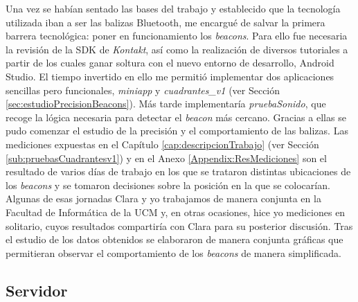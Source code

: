 Una vez se habían sentado las bases del trabajo y establecido que la tecnología utilizada iban a ser las balizas Bluetooth, me encargué de salvar la primera barrera tecnológica: poner en funcionamiento los \textit{beacons}. Para ello fue necesaria la revisión de la SDK de \textit{Kontakt}, así como la realización de diversos tutoriales a partir de los cuales ganar soltura con el nuevo entorno de desarrollo, Android Studio. El tiempo invertido en ello me permitió implementar dos aplicaciones sencillas pero funcionales, \textit{miniapp} y \textit{cuadrantes\_v1} (ver Sección \ref{sec:estudioPrecisionBeacons}). Más tarde implementaría \textit{pruebaSonido}, que recoge la lógica necesaria para detectar el \textit{beacon} más cercano. Gracias a ellas se pudo comenzar el estudio de la precisión y el comportamiento de las balizas. Las mediciones expuestas en el Capítulo \ref{cap:descripcionTrabajo} (ver Sección \ref{sub:pruebasCuadrantesv1}) y en el Anexo \ref{Appendix:ResMediciones} son el resultado de varios días de trabajo en los que se trataron distintas ubicaciones de los \textit{beacons} y se tomaron decisiones sobre la posición en la que se colocarían. Algunas de esas jornadas Clara y yo trabajamos de manera conjunta en la Facultad de Informática de la UCM y, en otras ocasiones, hice yo mediciones en solitario, cuyos resultados compartiría con Clara para su posterior discusión. Tras el estudio de los datos obtenidos se elaboraron de manera conjunta gráficas que permitieran observar el comportamiento de los \textit{beacons} de manera simplificada.

\subsection{Servidor}

